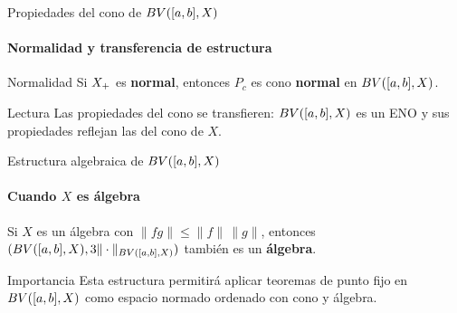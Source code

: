 
\begin{frame}{Propiedades del cono de $BV([a,b],X)$}
\framesubtitle{Normalidad y transferencia de estructura}

\begin{block}{Normalidad}
Si $X_{+}$ es \textbf{normal}, entonces $P_c$ es cono \textbf{normal}
en $BV([a,b],X)$.
\end{block}

\medskip

\begin{alertblock}{Lectura}
Las propiedades del cono se transfieren: $BV([a,b],X)$ es un ENO y
sus propiedades reflejan las del cono de $X$.
\end{alertblock}

\end{frame}


\begin{frame}{Estructura algebraica de $BV([a,b],X)$}
\framesubtitle{Cuando $X$ es álgebra}

\begin{theorem}
Si $X$ es un álgebra con $\|fg\|\le\|f\|\,\|g\|$,
entonces $(BV([a,b],X),3\|\cdot\|_{BV([a,b],X)})$ también es un \textbf{álgebra}.
\end{theorem}

\medskip

\begin{alertblock}{Importancia}
Esta estructura permitirá aplicar teoremas de punto fijo en $BV([a,b],X)$
como espacio normado ordenado con cono y álgebra.
\end{alertblock}


\end{frame}
